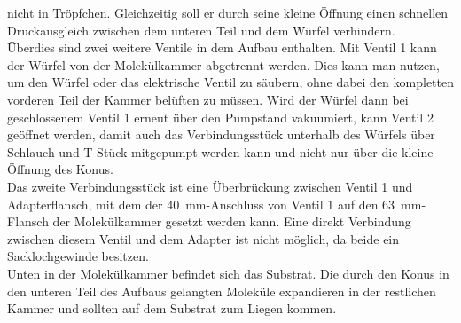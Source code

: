 nicht in Tröpfchen. Gleichzeitig soll er durch seine kleine Öffnung einen schnellen Druckausgleich zwischen
dem unteren Teil und dem Würfel verhindern.
 \\
Überdies sind zwei weitere Ventile in dem Aufbau enthalten. Mit Ventil 1 kann der Würfel von der
Molekülkammer abgetrennt werden. Dies kann man nutzen, um den Würfel oder das elektrische Ventil zu
säubern, ohne dabei den kompletten vorderen Teil der Kammer belüften zu müssen. Wird der Würfel dann bei
geschlossenem Ventil 1 erneut über den Pumpstand vakuumiert, kann Ventil 2 geöffnet werden, damit auch das Verbindungsstück
unterhalb des Würfels über Schlauch und T-Stück mitgepumpt werden kann und nicht nur über die kleine Öffnung
des Konus.
\\
Das zweite Verbindungsstück ist eine Überbrückung zwischen Ventil 1 und Adapterflansch, mit dem
der \SI{40}{mm}-Anschluss von Ventil 1 auf den \SI{63}{mm}-Flansch der Molekülkammer gesetzt werden
kann. Eine direkt Verbindung zwischen diesem Ventil und dem Adapter ist nicht möglich, da beide ein
Sacklochgewinde besitzen.
\\
Unten in der Molekülkammer befindet sich das Substrat. Die durch den Konus in den unteren Teil des Aufbaus
gelangten Moleküle expandieren in der restlichen Kammer und sollten auf dem Substrat zum Liegen
kommen.

\FloatBarrier

